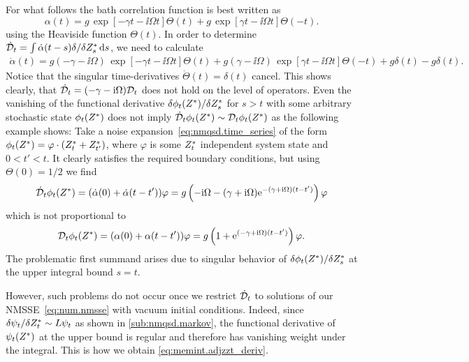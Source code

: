 For what follows the bath correlation function is best written as
\begin{equation*}
  \alpha(t) = g \, \exp[-\gamma t - \ii \Omega t] \Theta(t) + g \, \exp[\gamma t - \ii \Omega t] \Theta(-t).
\end{equation*}
using the Heaviside function $\Theta(t)$.
In order to determine $\dot{\mathcal{D}}_t = \int\dot\alpha(t-s)\delta/\delta {Z}^*_s \, \mathrm{d} s$, we need to calculate
\begin{align*}
  \dot\alpha(t) = g (-\gamma - \ii\Omega) \, \exp[-\gamma t - \ii \Omega t] \Theta(t) + g (\gamma - \ii\Omega)\, \exp[\gamma t - \ii \Omega t] \Theta(-t)
  + g \delta(t) - g \delta(t).
\end{align*}
Notice that the singular time-derivatives $\dot\Theta(t) = \delta(t)$ cancel.
This shows clearly, that $\dot{\mathcal{D}}_t = (-\gamma - \mathrm{i}\Omega)\mathcal{D}_t$ does not hold on the level of operators.
Even the vanishing of the functional derivative $\delta \phi_t({Z}^*) / \delta {Z}^*_s$ for $s > t$ with some arbitrary stochastic state $\phi_t({Z}^*)$ does not imply $\dot{\mathcal{D}}_t \phi_t({Z}^*) \sim \mathcal{D}_t\phi_t({Z}^*)$ as the following example shows:
Take a noise expansion~\ref{eq:nmqsd.time_series} of the form $\phi_t({Z}^*) = \varphi \cdot ({Z}^*_t + {Z}^*_{t'})$, where $\varphi$ is some ${Z}^*_t$ independent system state and $0 < t' < t$.
It clearly satisfies the required boundary conditions, but using $\Theta(0) = 1/2$ we find
\begin{equation*}
  \dot\adjZZ_t \phi_t(\ZZ) = (\dot\alpha(0) + \dot\alpha(t-t')) \varphi = g \left( -\ii\Omega - (\gamma + \ii\Omega) \exp[-(\gamma + \ii\Omega) (t-t')] \right) \varphi
\end{equation*}
which is not proportional to
\begin{equation*}
  \adjZZ_t \phi_t(\ZZ) = (\alpha(0) + \alpha(t - t')) \varphi = g \left(1 + \exp[(-\gamma + \ii \Omega)(t-t')]  \right) \varphi.
\end{equation*}
The problematic first summand arises due to singular behavior of $\delta \phi_t({Z}^*) / \delta {Z}^*_s$ at the upper integral bound $s = t$.

However, such problems do not occur once we restrict $\dot{\mathcal{D}}_t$ to solutions of our NMSSE~\ref{eq:num.nmsse} with vacuum initial conditions.
Indeed, since $\delta\psit / \delta\ZZ_t \propto L\psit$ as shown in \autoref{sub:nmqsd.markov}, the functional derivative of $\psitZ$ at the upper bound is regular and therefore has vanishing weight under the integral.
This is how we obtain \autoref{eq:memint.adjzzt_deriv}.

